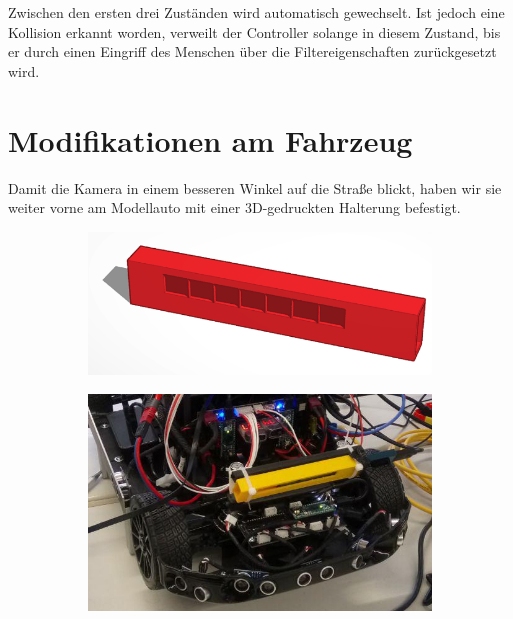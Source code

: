 \documentclass[a4paper,12pt]{report}
\begin{document}
	Zwischen den ersten drei Zuständen wird automatisch gewechselt.
	Ist jedoch eine Kollision erkannt worden, verweilt der Controller solange in diesem Zustand, bis er durch einen Eingriff des Menschen über die Filtereigenschaften zurückgesetzt wird.

\chapter{Modifikationen am Fahrzeug}

Damit die Kamera in einem besseren Winkel auf die Straße blickt, haben wir sie weiter vorne am Modellauto mit einer 3D-gedruckten Halterung befestigt. 
\begin{figure}[ht]
	\centering
	\begin{subfigure}[c]{.45\textwidth}
		\includegraphics[width=\textwidth]{assets/Kamerahalterung.PNG}
	\end{subfigure}
	\begin{subfigure}[c]{.45\textwidth}
		\includegraphics[width=\textwidth]{assets/Kamera-Anbringung.jpg}
	\end{subfigure}
	\begin{subfigure}{\textwidth}

\end{subfigure}
\end{figure}
\end{document}
